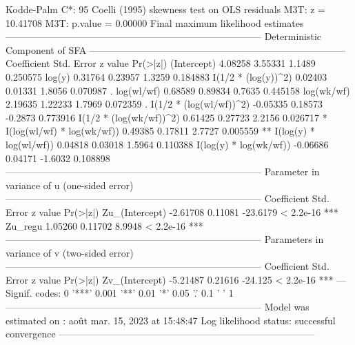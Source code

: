 \documentclass[nojss]{jss}
\begin{document}
\begin{Schunk}
\begin{Soutput}
Kodde-Palm C*:       95%: 5.13838                                   99%: 8.27327 
Coelli (1995) skewness test on OLS residuals
M3T: z                         =                                        10.41708 
M3T: p.value                   =                                         0.00000 
Final maximum likelihood estimates 
-------------------------------------------------------------------------------- 
                         Deterministic Component of SFA 
-------------------------------------------------------------------------------- 
                           Coefficient Std. Error z value Pr(>|z|)   
(Intercept)                    4.08258    3.55331  1.1489 0.250575   
log(y)                         0.31764    0.23957  1.3259 0.184883   
I(1/2 * (log(y))^2)            0.02403    0.01331  1.8056 0.070987 . 
log(wl/wf)                     0.68589    0.89834  0.7635 0.445158   
log(wk/wf)                     2.19635    1.22233  1.7969 0.072359 . 
I(1/2 * (log(wl/wf))^2)       -0.05335    0.18573 -0.2873 0.773916   
I(1/2 * (log(wk/wf))^2)        0.61425    0.27723  2.2156 0.026717 * 
I(log(wl/wf) * log(wk/wf))     0.49385    0.17811  2.7727 0.005559 **
I(log(y) * log(wl/wf))         0.04818    0.03018  1.5964 0.110388   
I(log(y) * log(wk/wf))        -0.06686    0.04171 -1.6032 0.108898   
-------------------------------------------------------------------------------- 
                  Parameter in variance of u (one-sided error) 
-------------------------------------------------------------------------------- 
                           Coefficient Std. Error  z value  Pr(>|z|)    
Zu_(Intercept)                -2.61708    0.11081 -23.6179 < 2.2e-16 ***
Zu_regu                        1.05260    0.11702   8.9948 < 2.2e-16 ***
-------------------------------------------------------------------------------- 
                 Parameters in variance of v (two-sided error) 
-------------------------------------------------------------------------------- 
                           Coefficient Std. Error z value  Pr(>|z|)    
Zv_(Intercept)                -5.21487    0.21616 -24.125 < 2.2e-16 ***
---
Signif. codes:  0 '***' 0.001 '**' 0.01 '*' 0.05 '.' 0.1 ' ' 1
-------------------------------------------------------------------------------- 
Model was estimated on : août mar. 15, 2023 at 15:48:47 
Log likelihood status: successful convergence  
-------------------------------------------------------------------------------- 
\end{Soutput}
\end{Schunk}
\end{document}
